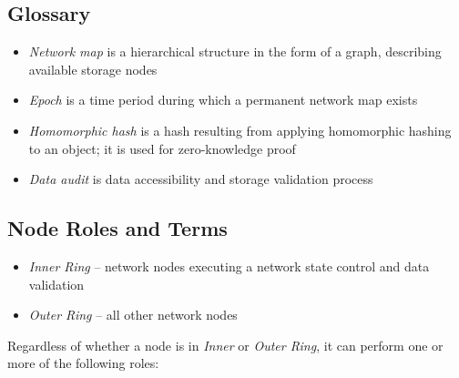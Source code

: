 \documentclass[a4paper, 11pt]{article}
\begin{document}
\subsection{Glossary}

\begin{itemize}[]
\item \textit{Network map} is a hierarchical structure in the form of a graph, describing available storage nodes

\item \textit{Epoch} is a time period during which a permanent network map exists

\item \textit{Homomorphic hash} is a hash resulting from applying homomorphic hashing to an object; it is used for zero-knowledge proof

\item \textit{Data audit} is data accessibility and storage validation process\end{itemize}

\subsection{Node Roles and Terms}

\begin{itemize}%
        \item \textit{Inner Ring} -- network nodes executing a network state control and data validation
        \item \textit{Outer Ring} -- all other network nodes
\end{itemize}

Regardless of whether a node is in \textit{Inner} or \textit{Outer Ring}, it can perform one or more of the following roles:
\end{document}
